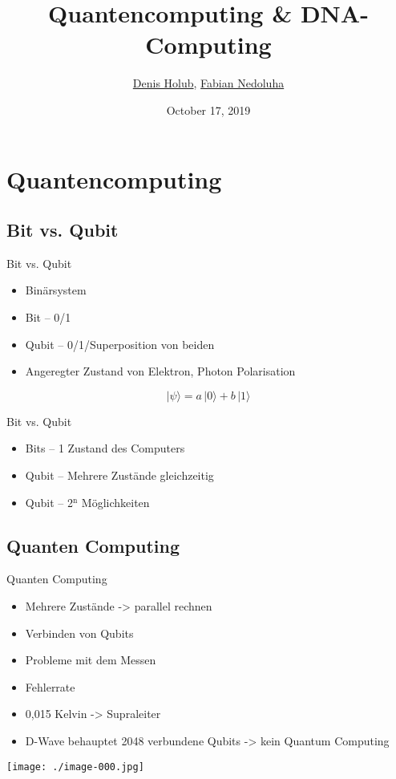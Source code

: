 \documentclass[aspectratio=1610]{beamer}
\author{\href{mailto:denis.holub@stud.sbg.ac.at}{Denis Holub}, \href{mailto:fabian.nedoluha@stud.sbg.ac.at}{Fabian Nedoluha}}
\date{October 17, 2019}
\title{Quantencomputing \& DNA-Computing}
\institute[INST]{\href{https://www.uni-salzburg.at/index.php?id=39957}{Univ. Salzburg - Computerwissenschaften}}
\begin{document}
\maketitle

\section{Quantencomputing}
\label{sec:orgb98938d}

\subsection{Bit vs. Qubit}
\label{sec:org4210bed}

\begin{frame}[label={sec:orgb561d02}]{Bit vs. Qubit}
\begin{itemize}
\item Binärsystem
\item Bit – 0/1
\item Qubit – 0/1/Superposition von beiden
\item Angeregter Zustand von Elektron, Photon Polarisation
\end{itemize}

\begin{equation}
    |\psi\rangle = a \, |0\rangle + b \, |1\rangle
\end{equation}
\end{frame}

\begin{frame}[label={sec:org68a03d4}]{Bit vs. Qubit}
\begin{itemize}
\item Bits – 1 Zustand des Computers
\item Qubit – Mehrere Zustände gleichzeitig
\item Qubit – 2\(^{\text{n}}\) Möglichkeiten
\end{itemize}
\end{frame}

\subsection{Quanten Computing}
\label{sec:orgb13c2b2}

\begin{frame}[label={sec:org4854eea}]{Quanten Computing}
\begin{itemize}
\item Mehrere Zustände -> parallel rechnen
\item Verbinden von Qubits
\item Probleme mit dem Messen
\item Fehlerrate
\item 0,015 Kelvin -> Supraleiter
\item D-Wave behauptet 2048 verbundene Qubits -> kein Quantum Computing
\end{itemize}

\begin{center}
\texttt{[image: ./image-000.jpg]}
\end{center}
\end{frame}
\end{document}
